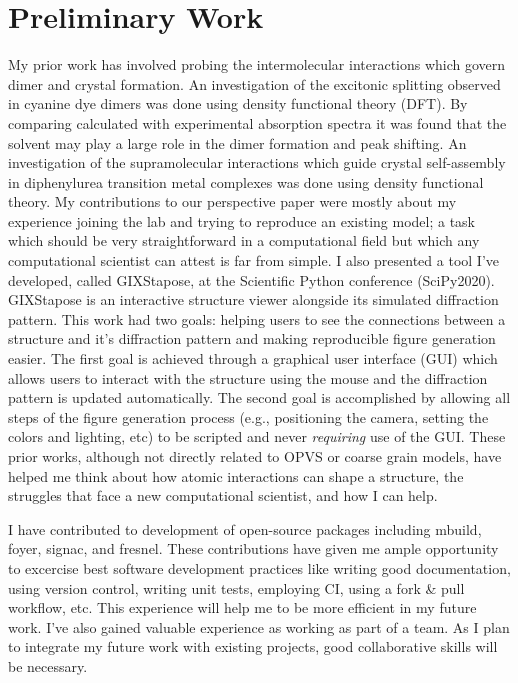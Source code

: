 \section*{Preliminary Work}

My prior work has involved probing the intermolecular interactions which govern dimer and crystal formation.
An investigation of the excitonic splitting observed in cyanine dye dimers was done using density functional theory (DFT)\cite{Fothergill2018}.
By comparing calculated with experimental absorption spectra it was found that the solvent may play a large role in the dimer formation and peak shifting.
An investigation of the supramolecular interactions which guide crystal self-assembly in diphenylurea transition metal complexes was done using density functional theory\cite{Millard2019a}. 
My contributions to our perspective paper were mostly about my experience joining the lab and trying to reproduce an existing model; a task which should be very straightforward in a computational field but which any computational scientist can attest is far from simple\cite{Jankowski2019}. 
I also presented a tool I've developed, called GIXStapose, at the Scientific Python conference (SciPy2020). %
GIXStapose is an interactive structure viewer alongside its simulated diffraction pattern.
This work had two goals: helping users to see the connections between a structure and it's diffraction pattern and making reproducible figure generation easier.
The first goal is achieved through a graphical user interface (GUI) which allows users to interact with the structure using the mouse and the diffraction pattern is updated automatically.
The second goal is accomplished by allowing all steps of the figure generation process (e.g., positioning the camera, setting the colors and lighting, etc) to be scripted and never \textit{requiring} use of the GUI.
These prior works, although not directly related to OPVS or coarse grain models, have helped me think about how atomic interactions can shape a structure, the struggles that face a new computational scientist, and how I can help.

I have contributed to development of open-source packages including mbuild, foyer, signac, and fresnel. %
These contributions have given me ample opportunity to excercise best software development practices like writing good documentation, using version control, writing unit tests, employing CI, using a fork \& pull workflow, etc.
This experience will help me to be more efficient in my future work.
I've also gained valuable experience as working as part of a team.
As I plan to integrate my future work with existing projects, good collaborative skills will be necessary.


